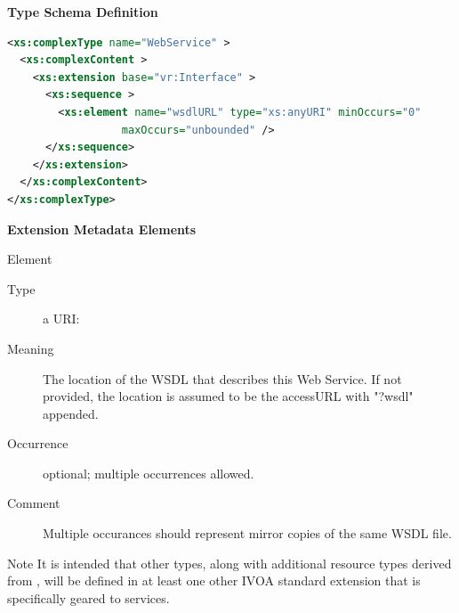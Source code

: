 \documentclass[11pt,a4paper]{ivoa}
\begin{document}

\vspace{1ex}\noindent\textbf{ Type Schema Definition}

\begin{lstlisting}[language=XML,basicstyle=\footnotesize]
<xs:complexType name="WebService" >
  <xs:complexContent >
    <xs:extension base="vr:Interface" >
      <xs:sequence >
        <xs:element name="wsdlURL" type="xs:anyURI" minOccurs="0"
                  maxOccurs="unbounded" />
      </xs:sequence>
    </xs:extension>
  </xs:complexContent>
</xs:complexType>
\end{lstlisting}

\vspace{0.5ex}\noindent\textbf{ Extension Metadata Elements}

\begingroup\small\begin{bigdescription}\item[Element \xmlel{wsdlURL}]
\begin{description}
\item[Type] a URI: 
\item[Meaning] 
                        The location of the WSDL that describes this
                        Web Service.  If not provided, the location is 
                        assumed to be the accessURL with {"}?wsdl{"} appended.
                     
\item[Occurrence] optional; multiple occurrences allowed.
\item[Comment] 
                        Multiple occurances should represent mirror copies of 
                        the same WSDL file.  
                     

\end{description}


\end{bigdescription}\endgroup

\endgroup


\begin{admonition}{Note}
It is intended that other  types,
along with additional resource types derived from
, will be defined in at least one other
IVOA standard extension that is specifically geared to
services.  
\end{admonition}
\end{document}
